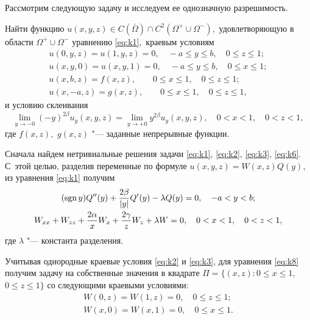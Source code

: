 Рассмотрим следующую задачу и  исследуем ее однозначную разрешимость.

\smallskip

\hypertarget{task:D}{}

\begin{task}[D]Найти функцию $u(x,y,z)\in C(\bar\Omega)\cap C^2(\Omega^+\cup\Omega^-),$ удовлетворяющую в области $\Omega^+\cup\Omega^-$ уравнению \eqref{eq:k1}$,$ краевым условиям
\begin{gather}
u(0,y,z)=u(1,y,z)=0,\quad -a\le y\le b, \quad 0\le z\le 1; 
\label{eq:k2}
\\
u(x,y,0)=u(x,y,1)=0, \quad -a\le y\le b, \quad 0\le x\le 1;
\label{eq:k3}
\\
u(x,b,z)=f(x,z), \qquad 0\le x\le 1, \quad 0\le z\le 1;
\label{eq:k4}
\\
u(x,-a,z)=g(x,z), \qquad 0\le x\le 1, \quad 0\le z\le 1,
\label{eq:k5}
\end{gather}
и условию склеивания 
\begin{equation}
\lim\limits_{y\to-0}(-y)^{2\beta}u_y(x,y,z)=\lim\limits_{y\to+0}y^{2\beta}u_y(x,y,z), \quad 0<x<1,\quad 0<z<1,
\label{eq:k6}
\end{equation}
где $f(x,z),$ $g(x,z)$ "--- заданные непрерывные функции$.$
\end{task}

\smallskip


Сначала найдем нетривиальные решения задачи \eqref{eq:k1}, \eqref{eq:k2}, \eqref{eq:k3}, \eqref{eq:k6}. 
С~этой целью, разделив переменные по формуле $u(x,y,z)=W(x,z)Q(y),$  из уравнения \eqref{eq:k1} получим
\begin{gather}
(\mathop{\rm sgn}y)Q''(y)+\frac{2\beta}{|y|}Q'(y)-\lambda Q(y)=0, \quad -a<y<b; 
\label{eq:k7}
\\
W_{xx}+W_{zz}+\frac{2\alpha}{x}W_x+\frac{2\gamma}{z}W_z+\lambda W=0, \quad 0<x<1,\quad 0<z<1, \label{eq:k8}
\end{gather}
где $\lambda$ "--- константа разделения.

Учитывая однородные краевые условия \eqref{eq:k2} и \eqref{eq:k3}, для уравнения \eqref{eq:k8} получим задачу на собственные значения в квадрате $\Pi =\{(x,z):{0\le x\le1}, $ ${0\le z\le1}\}$ со следующими краевыми условиями:
\begin{gather}
W(0,z)=W(1,z)=0,\quad 0\le z\le 1; \\ 
W(x,0)=W(x,1)=0,\quad 0\le x\le 1.
\end{gather}

